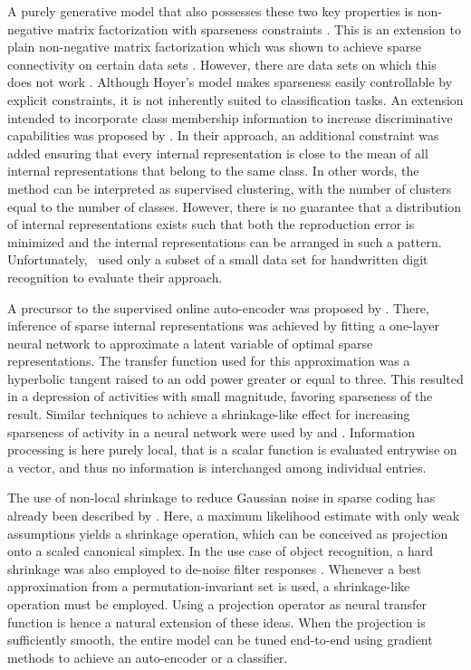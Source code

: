 \documentclass[twoside,11pt]{article}
\newcommand{\0}{\mathcal{O}}
\begin{document}
A purely generative model that also possesses these two key properties is non-negative matrix factorization with sparseness constraints \citep{Hoyer2004}.
This is an extension to plain non-negative matrix factorization \citep{Paatero1994} which was shown to achieve sparse connectivity on certain data sets \citep{Lee1999}.
However, there are data sets on which this does not work \citep{Li2001,Hoyer2004}.
Although Hoyer's model makes sparseness easily controllable by explicit constraints, it is not inherently suited to classification tasks.
An extension intended to incorporate class membership information to increase discriminative capabilities was proposed by \citet{Heiler2006}.
In their approach, an additional constraint was added ensuring that every internal representation is close to the mean of all internal representations that belong to the same class.
In other words, the method can be interpreted as supervised clustering, with the number of clusters equal to the number of classes.
However, there is no guarantee that a distribution of internal representations exists such that both the reproduction error is minimized and the internal representations can be arranged in such a pattern.
Unfortunately, \citet{Heiler2006}~used only a subset of a small data set for handwritten digit recognition to evaluate their approach.

A precursor to the supervised online auto-encoder was proposed by \citet{Thom2011d}.
There, inference of sparse internal representations was achieved by fitting a one-layer neural network to approximate a latent variable of optimal sparse representations.
The transfer function used for this approximation was a hyperbolic tangent raised to an odd power greater or equal to three.
This resulted in a depression of activities with small magnitude, favoring sparseness of the result.
Similar techniques to achieve a shrinkage-like effect for increasing sparseness of activity in a neural network were used by \citet{Gregor2010} and \citet{Glorot2011}.
Information processing is here purely local, that is a scalar function is evaluated entrywise on a vector, and thus no information is interchanged among individual entries.

The use of non-local shrinkage to reduce Gaussian noise in sparse coding has already been described by \citet{Hyvaerinen1999a}.
Here, a maximum likelihood estimate with only weak assumptions yields a shrinkage operation, which can be conceived as projection onto a scaled canonical simplex.
In the use case of object recognition, a hard shrinkage was also employed to de-noise filter responses \citep{Mutch2006}.
Whenever a best approximation from a permutation-invariant set is used, a shrinkage-like operation must be employed.
Using a projection operator as neural transfer function is hence a natural extension of these ideas.
When the projection is sufficiently smooth, the entire model can be tuned end-to-end using gradient methods to achieve an auto-encoder or a classifier.
\end{document}
